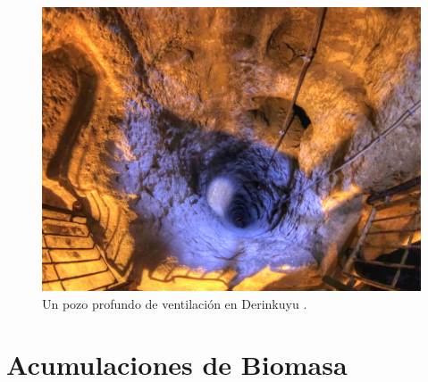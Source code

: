 \documentclass[10pt,twocolumn,letterpaper]{article}
\begin{document}
\begin{figure}[t]
\begin{center}
   \includegraphics[width=1\linewidth]{derinkuyu-air.jpg}
\end{center}
   \caption{Un pozo profundo de ventilación en Derinkuyu \cite{53}.}
\label{fig:6}
\label{fig:onecol}
\end{figure}


\section{Acumulaciones de Biomasa}
\end{document}
